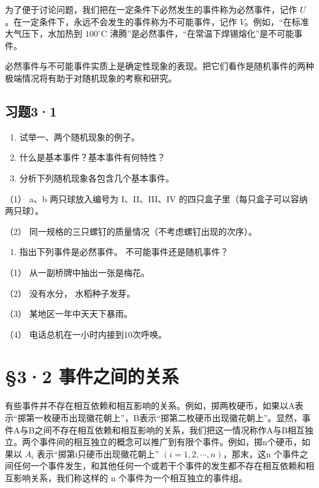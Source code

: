 为了便于讨论问题，我们把在一定条件下必然发生的事件称为必然事件，记作
\(U\)。在一定条件下，永远不会发生的事件称为不可能事件，记作
\(V\)。例如，``在标准大气压下，水加热到 \(100^{\circ} \mathrm{C}\)
沸腾''是必然事件，``在常温下焊锡熔化''是不可能事件。

必然事件与不可能事件实质上是确定性现象的表现。把它们看作是随机事件的两种极端情况将有助于对随机现象的考察和研究。

\subsection{习题3·1}

\begin{enumerate}
\item
  试举一、两个随机现象的例子。
\item
  什么是基本事件？基本事件有何特性？
\item
  分析下列随机现象各包含几个基本事件。
\end{enumerate}

（1） a、b 两只球放入编号为 I、II、III、IV
的四只盒子里（每只盒子可以容纳两只球）。

（2） 同一规格的三只螺钉的质量情况（不考虑螺钉出现的次序）。

\begin{enumerate}[start=4]
\item
  指出下列事件是必然事件。 不可能事件还是随机事件？
\end{enumerate}

（1） 从一副桥牌中抽出一张是梅花。

（2） 没有水分， 水稻种子发芽。

（3） 某地区一年中天天下暴雨。

（4） 电话总机在一小时内接到10次呼唤。

\section{§3·2 事件之间的关系}

有些事件并不存在相互依赖和相互影响的关系。例如，掷两枚硬币，如果以A表示``掷第一枚硬币出现徽花朝上''，B表示``掷第二枚硬币出现徽花朝上''。显然，事件A与B之间不存在相互依赖和相互影响的关系，我们把这一情况称作A与B相互独立。两个事件间的相互独立的概念可以推广到有限个事件。例如，掷n个硬币，如果以
\(A_{i}\) 表示``掷第i只硬币出现徽花朝上''
\((i=1,2,\cdots,n)\)，那末，这n
个事件之间任何一个事件发生，和其他任何一个或若干个事件的发生都不存在相互依赖和相互影响关系，我们称这样的
n 个事件为一个相互独立的事件组。

